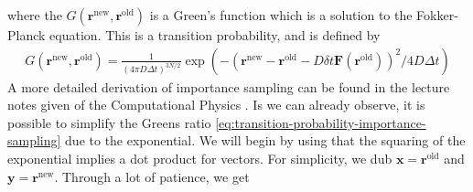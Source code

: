 \documentclass[11pt]{article}
\newcommand{\rn}{\mathbf{r}^\text{new}}
\newcommand{\ro}{\mathbf{r}^\text{old}}
\begin{document}
where the $G(\mathbf{r}^\text{new},\mathbf{r}^\text{old})$ is a Green's function which is a solution to the Fokker-Planck equation. This is a transition probability, and is defined by
\begin{align}
	G(\mathbf{r}^\text{new},\mathbf{r}^\text{old}) = \frac{1}{(4\pi D \Delta t)^{3N/2}}\exp \left(-(\rn - \ro - D\delta t \mathbf{F}(\ro))^2/4D\Delta t\right)
	\label{eq:greens-function}
\end{align}
A more detailed derivation of importance sampling can be found in the lecture notes given of the Computational Physics \cite{komp2015}. Is we can already observe, it is possible to simplify the Greens ratio \eqref{eq:transition-probability-importance-sampling} due to the exponential. We will begin by using that the squaring of the exponential implies a dot product for vectors. For simplicity, we dub $\mathbf{x} = \mathbf{r}^\text{old}$ and $\mathbf{y} = \mathbf{r}^\text{new}$. Through a lot of patience, we get
\end{document}
